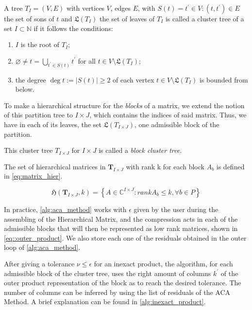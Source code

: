 A tree $T_{I} = (V,E)$ with vertices $V$, edges $E$, with $S(t)={t^{'} \in V : (t,t^{'})\in E}$ the set of sons of $t$ and $\mathfrak{L}(T_{I})$ the set of leaves of $T_{I}$ is called a cluster tree of a set $I\subset \mathbb{N}$ if it follows the conditions:

\begin{enumerate}
    \item $I$ is the root of $T_{I}$;
    \item $\varnothing \neq t = \bigcup_{t^{'} \in S(t)} t^{'} $ for all $t \in V \setminus   \mathfrak{L}(T_{I}) $;
    \item the degree $\deg t := |S(t)| \geq 2$ of each vertex $t \in V \setminus \mathfrak{L}(T_{I})$ is bounded from below.
\end{enumerate}



To make a hierarchical structure for the \textit{blocks} of a matrix, we extend the notion of this partition tree to $I \times J$, which contains the indices of said matrix. Thus, we have in each of its leaves, the set $\mathfrak{L}(T_{I \times J})$, one admissible block of the partition.

This cluster tree $T_{I \times J}$ for $I \times J$ is called a \textit{block cluster tree}.


The set of hierarchical matrices in $\mathbf{T}_{I \times J}$ with rank k for each block $A_{b}$ is defined in \ref{eq:matrix_hier}.

\begin{equation}\label{eq:matrix_hier}
    \mathfrak{H}(\mathbf{T}_{I \times J},k) = \left\{  A\in \mathbb{C}^{I\times J} : rankA_{b} \leq k, \forall b \in P \right\}
\end{equation}



In practice, \ref{alg:aca_method} works with $\epsilon$ given by the user during the assembling of the Hierarchical Matrix, and the compression acts in each of the admissible blocks that will then be represented as low rank matrices, shown in \ref{eq::outer_product}. We also store each one of the residuals obtained in the outer loop of \ref{alg:aca_method}.

After giving a tolerance $\nu  \leq \epsilon$ for an inexact product, the algorithm, for each admissible block of the cluster tree, uses the right amount of columns $k^{'}$ of the outer product representation of the block as to reach the desired tolerance. The number of columns can be inferred by using the list of residuals of the ACA Method. A brief explanation can be found in \ref{alg:inexact_product}.

